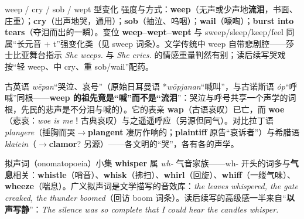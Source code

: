 \documentclass[../main.tex]{subfiles}
\begin{document}
\begin{gram}{weep / cry / sob / wept 型变化}
强度与方式：\textbf{weep}（无声或少声地\textbf{流泪}，书面、庄重）；\textbf{cry}（出声地哭，通用）；\textbf{sob}（抽泣、呜咽）；\textbf{wail}（嚎啕）；\textbf{burst into tears}（夺泪而出的一瞬）。变位 \textbf{weep--wept--wept} 与 sweep/sleep/keep/feel 同属“长元音 + t”强变化类（见 sweep 词条）。文学传统中 weep 自带悲剧腔——莎士比亚舞台指示 \textit{She weeps.} 与 \textit{She cries.} 的情感重量判然有别；读后续写哭戏按“轻 weep、中 cry、重 sob/wail”配药。
\end{gram}

\begin{origin}
古英语 \textit{wēpan}“哭泣、哀号”（原始日耳曼语 *\textit{wōpjanan}“喊叫”，与古诺斯语 \textit{óp}“呼喊”同根——\textbf{weep 的祖先竟是“喊”而不是“流泪}”：哭泣与呼号共享一个声学的词根，先民的悲声是不分泪与喊的）。它的表亲 \textbf{wap}（古语哀叹）已亡，而 \textbf{woe}（悲哀：\textit{woe is me}！古典哀叹）与之遥遥呼应（另源但同气）。对比拉丁语 \textit{plangere}（捶胸而哭$\to$\textbf{plangent} 凄厉作响的；\textbf{plaintiff} 原告“哀诉者”）与希腊语 \textit{klaiein}（$\to$\textbf{clamor}? 另源）——各文明的“哭”，各有各的声学。
\end{origin}




\begin{gram}{拟声词（onomatopoeia）小集}
\textbf{whisper} 属 \textit{wh-} 气音家族——wh- 开头的词多与\textbf{气息}相关：\textbf{whistle}（哨音）、\textbf{whisk}（拂扫）、\textbf{whirl}（回旋）、\textbf{whiff}（一缕气味）、\textbf{wheeze}（喘息）。广义拟声词是文学描写的音效库：\textit{the leaves whispered, the gate creaked, the thunder boomed}（回访 boom 词条）。读后续写的高级感一半来自“\textbf{以声写静}”：\textit{The silence was so complete that I could hear the candles whisper.}
\end{gram}
\end{document}
